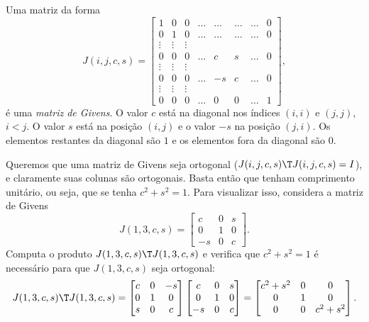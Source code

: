 \documentclass{article}
\begin{document}
\begin{defn}
    Uma matriz da forma
\[
    J(i,j,c,s) = \begin{bmatrix} 
        1 & 0 & 0 & \ldots & \ldots & \ldots & \ldots & 0 \\ 
        0 & 1 & 0 & \ldots & \ldots & \ldots & \ldots & 0 \\ 
        \vdots & \vdots & \vdots \\ 
        0 & 0 & 0 & \ldots & c & s & \ldots & 0 \\ 
        \vdots & \vdots & \vdots \\ 
        0 & 0 & 0 & \ldots & -s & c & \ldots & 0 \\ 
        \vdots & \vdots & \vdots \\ 
        0 & 0 & 0 & \ldots & 0 & 0 & \ldots & 1 
    \end{bmatrix},
\]
é uma \emph{matriz de Givens}. O valor \(c\) está na diagonal nos índices \((i,i)\) e \((j,j)\), \(i<j\). O valor \(s\) está na posição \((i,j)\) e o valor \(-s\) na posição \((j,i)\). Os elementos restantes da diagonal são \(1\) e os elementos fora da diagonal são \(0\).
\end{defn}

Queremos que uma matriz de Givens seja ortogonal (\(J(i,j,c,s)\T  J(i,j,c,s) = I\)), e claramente suas colunas são ortogonais. Basta então que tenham comprimento unitário, ou seja, que se tenha \(c^2+s^2=1\). Para visualizar isso, considera a matriz de Givens
\[
    J(1,3,c,s) = \begin{bmatrix} c & 0 & s \\ 0 & 1 & 0 \\ -s & 0 & c \end{bmatrix}.
\]
Computa o produto \(J(1,3,c,s)\T  J(1,3,c,s)\) e verifica que \(c^2+s^2=1\) é necessário para que \(J(1,3,c,s)\) seja ortogonal: 
\[
    J(1,3,c,s)\T  J(1,3,c,s) = \begin{bmatrix} c & 0 & -s \\ 0 & 1 & 0 \\ s & 0 & c \end{bmatrix} \begin{bmatrix} c & 0 & s \\ 0 & 1 & 0 \\ -s & 0 & c \end{bmatrix} = \begin{bmatrix} c^2+s^2 & 0 & 0 \\ 0 & 1 & 0 \\ 0 & 0 & c^2+s^2 \end{bmatrix}.
\]
\end{document}
